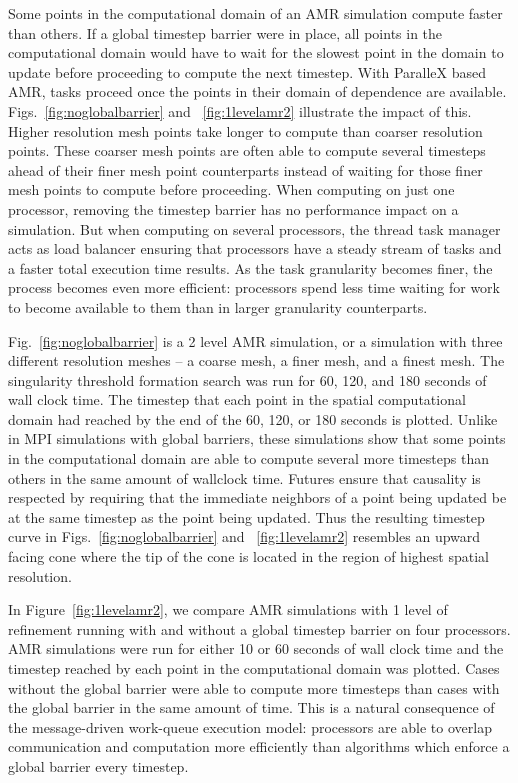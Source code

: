 \documentclass{revtex4}
\begin{document}
Some points in the computational domain of an AMR simulation compute faster than others.  If a global timestep
barrier were in place, all points in the computational domain would have to wait for the slowest point 
in the domain to update before proceeding to compute the next timestep.  
With ParalleX based AMR, tasks proceed once the points in their domain
of dependence are available. 
Figs.~\ref{fig:noglobalbarrier} and ~\ref{fig:1levelamr2} illustrate the impact of this.  Higher resolution mesh
points take longer to compute than coarser resolution points.  These coarser mesh points are often able to compute
several timesteps ahead of their finer mesh point counterparts instead of waiting for those finer mesh points
to compute before proceeding.    
When computing on just one processor, removing the timestep barrier has no performance impact on a simulation.
But when computing on several processors, the thread task manager acts as load balancer
ensuring that processors have a steady stream of tasks and a faster total execution time results. 
As the task granularity becomes finer, the process becomes even more efficient:  processors spend less time waiting
for work to become available to them than in larger granularity counterparts.

Fig.~\ref{fig:noglobalbarrier} is a 2 level AMR simulation, or a simulation with three different resolution meshes 
-- a coarse mesh, a finer mesh, and a finest mesh.  The singularity threshold formation search was run for 
60, 120, and 180 seconds of wall clock time.  The timestep that each point in the spatial computational domain 
had reached by the end of the 60, 120, or 180 seconds is plotted.  Unlike in MPI simulations with global barriers, 
these simulations show that some points in the computational domain are able to compute several 
more timesteps than others in the same amount of wallclock time.  
Futures ensure that causality is respected by requiring that the immediate neighbors of a point being updated 
be at the same timestep as the point being updated.  
Thus the resulting timestep curve in Figs.~\ref{fig:noglobalbarrier} and ~\ref{fig:1levelamr2} 
resembles an upward facing cone where the tip of the cone is located in the region of highest spatial resolution.

In Figure~\ref{fig:1levelamr2}, we compare AMR simulations with 1 level of refinement running with and without a global timestep barrier on four processors.  AMR simulations were run for either 10 or 60 seconds of wall clock time and the timestep reached by each point in the computational domain was plotted.  Cases without the global barrier were able to compute more timesteps than cases with the global barrier in the same amount of time.  This is a natural consequence of the message-driven work-queue execution model: processors are able to overlap communication and computation more efficiently than algorithms which enforce a global barrier every timestep.
\end{document}
